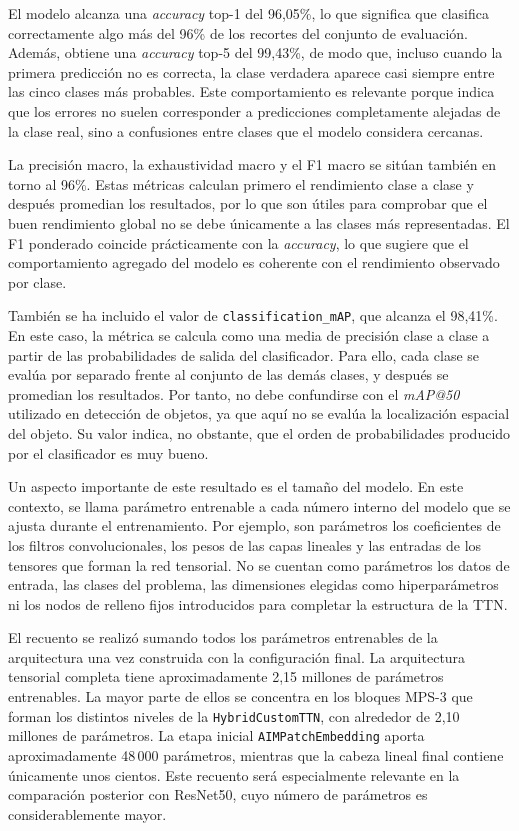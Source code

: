 El modelo alcanza una \textit{accuracy} top-1 del 96,05\%, lo que significa que clasifica correctamente algo más del 96\% de los recortes del conjunto de evaluación. Además, obtiene una \textit{accuracy} top-5 del 99,43\%, de modo que, incluso cuando la primera predicción no es correcta, la clase verdadera aparece casi siempre entre las cinco clases más probables. Este comportamiento es relevante porque indica que los errores no suelen corresponder a predicciones completamente alejadas de la clase real, sino a confusiones entre clases que el modelo considera cercanas.

La precisión macro, la exhaustividad macro y el F1 macro se sitúan también en torno al 96\%. Estas métricas calculan primero el rendimiento clase a clase y después promedian los resultados, por lo que son útiles para comprobar que el buen rendimiento global no se debe únicamente a las clases más representadas. El F1 ponderado coincide prácticamente con la \textit{accuracy}, lo que sugiere que el comportamiento agregado del modelo es coherente con el rendimiento observado por clase.

También se ha incluido el valor de \texttt{classification\_mAP}, que alcanza el 98,41\%. En este caso, la métrica se calcula como una media de precisión clase a clase a partir de las probabilidades de salida del clasificador. Para ello, cada clase se evalúa por separado frente al conjunto de las demás clases, y después se promedian los resultados. Por tanto, no debe confundirse con el \textit{mAP@50} utilizado en detección de objetos, ya que aquí no se evalúa la localización espacial del objeto. Su valor indica, no obstante, que el orden de probabilidades producido por el clasificador es muy bueno.

Un aspecto importante de este resultado es el tamaño del modelo. En este contexto, se llama parámetro entrenable a cada número interno del modelo que se ajusta durante el entrenamiento. Por ejemplo, son parámetros los coeficientes de los filtros convolucionales, los pesos de las capas lineales y las entradas de los tensores que forman la red tensorial. No se cuentan como parámetros los datos de entrada, las clases del problema, las dimensiones elegidas como hiperparámetros ni los nodos de relleno fijos introducidos para completar la estructura de la TTN.

El recuento se realizó sumando todos los parámetros entrenables de la arquitectura una vez construida con la configuración final. La arquitectura tensorial completa tiene aproximadamente 2,15 millones de parámetros entrenables. La mayor parte de ellos se concentra en los bloques MPS-3 que forman los distintos niveles de la \texttt{HybridCustomTTN}, con alrededor de 2,10 millones de parámetros. La etapa inicial \texttt{AIMPatchEmbedding} aporta aproximadamente 48\,000 parámetros, mientras que la cabeza lineal final contiene únicamente unos cientos. Este recuento será especialmente relevante en la comparación posterior con ResNet50, cuyo número de parámetros es considerablemente mayor.

